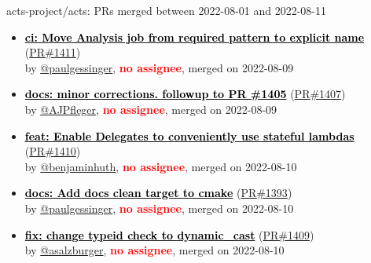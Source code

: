 \begin{frame}[allowframebreaks]{ acts-project/acts: PRs merged 
between 2022-08-01 and 2022-08-11
}
\begin{itemize}
    \item\prmerged
    \hspace*{0.1em}
    \textbf{\href{https://github.com/acts-project/acts/pull/1411}{\textcolor{black}{ci: Move Analysis job from required pattern to explicit name}}}
    (\href{https://github.com/acts-project/acts/pull/1411}{PR\#1411}) \\
    by \href{https://github.com/paulgessinger}{@paulgessinger}, {}\textbf{\textcolor{Red}{no assignee}}, merged on 2022-08-09

    \item\prmerged
    \hspace*{0.1em}
    \textbf{\href{https://github.com/acts-project/acts/pull/1407}{\textcolor{black}{docs: minor corrections. followup to PR \#1405}}}
    (\href{https://github.com/acts-project/acts/pull/1407}{PR\#1407}) \\
    by \href{https://github.com/AJPfleger}{@AJPfleger}, {}\textbf{\textcolor{Red}{no assignee}}, merged on 2022-08-09

    \item\prmerged
    \hspace*{0.1em}
    \textbf{\href{https://github.com/acts-project/acts/pull/1410}{\textcolor{black}{feat: Enable Delegates to conveniently use stateful lambdas}}}
    (\href{https://github.com/acts-project/acts/pull/1410}{PR\#1410}) \\
    by \href{https://github.com/benjaminhuth}{@benjaminhuth}, {}\textbf{\textcolor{Red}{no assignee}}, merged on 2022-08-10

    \item\prmerged
    \hspace*{0.1em}
    \textbf{\href{https://github.com/acts-project/acts/pull/1393}{\textcolor{black}{docs: Add docs clean target to cmake}}}
    (\href{https://github.com/acts-project/acts/pull/1393}{PR\#1393}) \\
    by \href{https://github.com/paulgessinger}{@paulgessinger}, {}\textbf{\textcolor{Red}{no assignee}}, merged on 2022-08-10

    \item\prmerged
    \hspace*{0.1em}
    \textbf{\href{https://github.com/acts-project/acts/pull/1409}{\textcolor{black}{fix: change typeid check to dynamic\_cast}}}
    (\href{https://github.com/acts-project/acts/pull/1409}{PR\#1409}) \\
    by \href{https://github.com/asalzburger}{@asalzburger}, {}\textbf{\textcolor{Red}{no assignee}}, merged on 2022-08-10


\end{itemize}
\end{frame}
